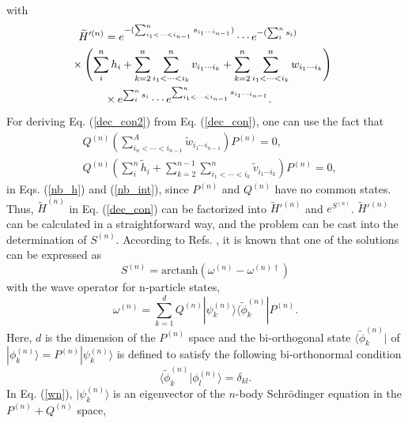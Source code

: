\documentclass[aps,prc, dvips, twocolumn,groupedaddress,showkeys,showpacs,floatfix,superscriptaddress]{revtex4-1}
\newcommand{\<}{\langle}
\renewcommand{\>}{\rangle}
\begin{document}
with
\begin{align}
  \widetilde{H}'^{(n)} &=
 e^{-(\sum_{i_{1}< \cdots < i_{n-1}}^n s_{i_{1}\cdots i_{n-1}})}\cdots
 e^{-(\sum_{i}^n s_{i})} \notag \\
&\hspace{-3em} \times
 \left(\sum_{i}^{n}h_{i}+\sum_{k=2}^{n}\sum_{i_{1}<\cdots
 <i_{k}}^{n}v_{i_{1}\cdots i_{k}}+
\sum_{k=2}^{n}\sum_{i_{1}<\cdots< i_{k}}^{n}w_{i_{1}\cdots
 i_{k}}\right) \notag \\
\label{prim_H}
& \times  e^{\sum_{i}^n s_{i}} \cdots
 e^{\sum_{i_{1}< \cdots < i_{n-1}}^n s_{i_{1}\cdots i_{n-1}}}.
\end{align}
For deriving Eq. (\ref{dec_con2}) from Eq. (\ref{dec_con}),
one can use the fact that
\begin{align}
  &Q^{(n)} \left(\sum_{i_{n}<\cdots < i_{n-1}}^{A}
\widetilde{w}_{i_{1}\cdots i_{n-1}} \right)P^{(n)} = 0, \\
 &Q^{(n)}\left(\sum_{i}^{n}\widetilde{h}_{i} +
 \sum_{k=2}^{n-1}\sum_{i_{1}<\cdots <i_{k}}^{n}
 \widetilde{v}_{i_{1}\cdots i_{k}}\right) P^{(n)} = 0,
\end{align}
 in Eqs. (\ref{nb_h}) and (\ref{nb_int}), since $P^{(n)}$ and $Q^{(n)}$ have no common states.
Thus,  $\widetilde{H}^{(n)}$ in Eq. (\ref{dec_con}) can be factorized  into $\widetilde{H}'^{(n)}$ and $e^{S^{(n)}}$.
$\widetilde{H}'^{(n)}$ can be calculated in a straightforward way, and
the problem can be cast into the determination of $S^{(n)}$.
According to Refs. \cite{Shavitt:1980,Westhaus:1981,Suzuki:1982},
it is known that one of the solutions can be expressed as
\begin{equation}
\label{Sn}
 S^{(n)} = \text{arctanh}(\omega^{(n)}-\omega^{(n)\dag})
\end{equation}
with the wave operator for n-particle states,
\begin{equation}
 \label{wn}
 \omega^{(n)}=\sum_{k=1}^{d}Q^{(n)}|\psi^{(n)}_{k}\>\<\widetilde{\phi}^{(n)}_{k}|P^{(n)}.
\end{equation}
Here, $d$ is the dimension of the $P^{(n)}$ space and
the bi-orthogonal state $\<\widetilde{\phi}^{(n)}_{k}|$ of $|\phi^{(n)}_{k}\>=P^{(n)}|\psi^{(n)}_{k}\>$
is defined to satisfy the following bi-orthonormal condition
\begin{equation}
 \label{bior}
 \<\widetilde{\phi}^{(n)}_{k}|\phi^{(n)}_{l}\>=\delta_{kl}.
\end{equation}
In Eq. (\ref{wn}), $|\psi^{(n)}_{k} \>$ is an eigenvector of
 the $n$-body Schr\"odinger equation
 in the $P^{(n)}+Q^{(n)}$ space,
\end{document}
